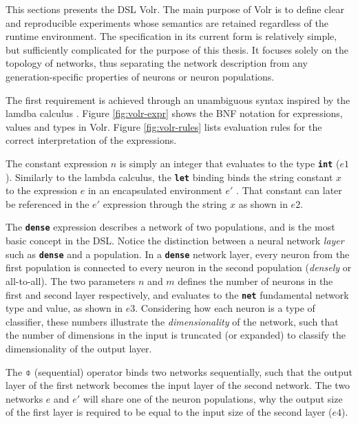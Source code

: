 This sections presents the \gls{DSL} Volr. 
The main purpose of Volr is to define clear and reproducible
experiments whose semantics are retained regardless of
the runtime environment.
The specification in its current form is relatively simple, but sufficiently 
complicated for the purpose of this thesis.
It focuses solely on the topology of networks, thus
separating the network description from any generation-specific properties
of neurons or neuron populations.

The first requirement is achieved through an unambiguous syntax inspired
by the lamdba calculus \cite{Pierce2002}.
Figure \ref{fig:volr-expr} shows the BNF notation for expressions, values and types
in Volr. 
Figure \ref{fig:volr-rules} lists evaluation rules for the correct
interpretation of the expressions.




The constant expression $n$ is simply an integer that evaluates to the type 
\texttt{\textbf{int}} ($e1$). 
Similarly to the lambda calculus, the \texttt{\textbf{let}} binding binds
the string constant $x$ to the expression $e$ in an encapsulated
environment $e'$ \cite{Pierce2002}.
That constant can later be referenced in the $e'$ expression 
through the string $x$ as shown in $e2$.

The \texttt{\textbf{dense}} expression describes a network of two
populations, and is the most basic concept in the \gls{DSL}.
Notice the distinction between a neural network \textit{layer}
such as \texttt{\textbf{dense}} and a population. 
In a \texttt{\textbf{dense}} network layer, every neuron from the
first population is connected to every neuron in the second population
(\textit{densely} or all-to-all).
The two parameters $n$ and $m$ defines the number of neurons in the first and 
second layer respectively, and evaluates to the \texttt{\textbf{net}}
fundamental network type and value, as shown in $e3$. 
Considering how each neuron is a type of classifier, these numbers
illustrate the \textit{dimensionality} of the network, such that the number of
dimensions in the input is truncated (or expanded) to classify the
dimensionality of the output layer.

The $\obar$ (sequential) operator binds two networks sequentially,
such that the output layer of the first network becomes the input layer 
of the second network.
The two networks $e$ and $e'$ will share one of the neuron populations, why
the output size of the first layer is required to be equal to the input
size of the second layer ($e4$).

